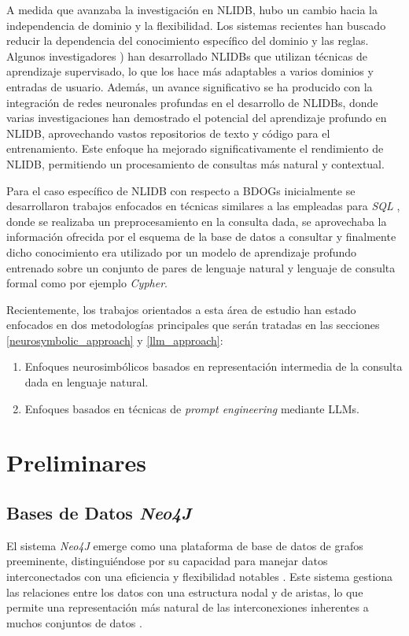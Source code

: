 A medida que avanzaba la investigación en NLIDB, hubo un cambio hacia la independencia de dominio y la flexibilidad. Los sistemas recientes han buscado reducir la dependencia del conocimiento específico del dominio y las reglas. Algunos investigadores \cite{zhongetal2017} \cite{yuetal2018}) han desarrollado NLIDBs que utilizan técnicas de aprendizaje supervisado, lo que los hace más adaptables a varios dominios y entradas de usuario. Además, un avance significativo se ha producido con la integración de redes neuronales profundas en el desarrollo de NLIDBs, donde varias investigaciones \cite{dongandlapata2016} \cite{devlinetal2018} han demostrado el potencial del aprendizaje profundo en NLIDB, aprovechando vastos repositorios de texto y código para el entrenamiento. Este enfoque ha mejorado significativamente el rendimiento de NLIDB, permitiendo un procesamiento de consultas más natural y contextual.

Para el caso específico de NLIDB con respecto a BDOGs inicialmente se desarrollaron trabajos enfocados en técnicas similares a las empleadas para \textit{SQL} \cite{adrainbazaga2021} \cite{hainsetal2019}, donde se realizaba un preprocesamiento en la consulta dada, se aprovechaba la información ofrecida por el esquema \cite{dbschema} de la base de datos a consultar y finalmente dicho conocimiento era utilizado por un modelo de aprendizaje profundo entrenado sobre un conjunto de pares de lenguaje natural y lenguaje de consulta formal como por ejemplo \textit{Cypher}.

Recientemente, los trabajos orientados a esta área de estudio han estado enfocados en dos metodologías principales que serán tratadas en las secciones \ref{neurosymbolic_approach} y \ref{llm_approach}:
\begin{enumerate}
	\item Enfoques neurosimbólicos basados en representación intermedia de la consulta dada en lenguaje natural.
	\item Enfoques basados en técnicas de \textit{prompt engineering} mediante LLMs.
\end{enumerate}

\section{Preliminares} \label{prelude}

\subsection{Bases de Datos \textit{Neo4J}} \label{neo4jdbs}
El sistema \textit{Neo4J} emerge como una plataforma de base de datos de grafos preeminente, distinguiéndose por su capacidad para manejar datos interconectados con una eficiencia y flexibilidad notables \cite{robinsonwebbereifrem2015}. Este sistema gestiona las relaciones entre los datos con una estructura nodal y de aristas, lo que permite una representación más natural de las interconexiones inherentes a muchos conjuntos de datos \cite{millerandrodriguez2013}.

